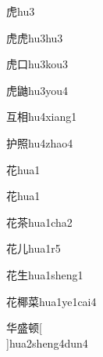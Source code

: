 \begin{verbete}[8]{虎}{hu3}
\end{verbete}

\begin{verbete}[8;8]{虎虎}{hu3hu3}
\end{verbete}

\begin{verbete}[8;3]{虎口}{hu3kou3}
\end{verbete}

\begin{verbete}[8;18]{虎鼬}{hu3you4}
\end{verbete}

\begin{verbete}[4;9]{互相}{hu4xiang1}
\end{verbete}

\begin{verbete}[7;13]{护照}{hu4zhao4}
\end{verbete}

\begin{verbete}[7]{花}{hua1}
\end{verbete}
\begin{verbete*}[7]{花}{hua1}
\end{verbete*}

\begin{verbete}[7;9]{花茶}{hua1cha2}
\end{verbete}

\begin{verbete}[7;2]{花儿}{hua1r5}
\end{verbete}

\begin{verbete}[7;5]{花生}{hua1sheng1}
\end{verbete}

\begin{verbete}[7;12;11]{花椰菜}{hua1ye1cai4}
\end{verbete}

\begin{verbete*}[6;11;10]{华盛顿}[\\]{hua2sheng4dun4}
\end{verbete*}


